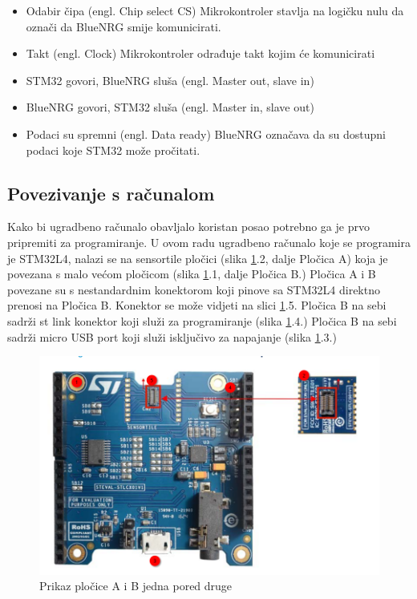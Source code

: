 \documentclass[times, utf8, diplomski]{diplomski}
\begin{document}
\begin{itemize}
  \item Odabir čipa (engl. Chip select CS) Mikrokontroler stavlja na logičku nulu da označi da BlueNRG smije komunicirati.
  \item Takt (engl. Clock) Mikrokontroler odrađuje takt kojim će komunicirati
  \item STM32 govori, BlueNRG sluša (engl. Master out, slave in)
  \item BlueNRG govori, STM32 sluša (engl. Master in, slave out)
  \item Podaci su spremni (engl. Data ready) BlueNRG označava da su dostupni podaci koje STM32 može pročitati.
\end{itemize}

\subsection{Povezivanje s računalom}
Kako bi ugradbeno računalo obavljalo koristan posao potrebno ga je prvo pripremiti za programiranje.
U ovom radu ugradbeno računalo koje se programira je STM32L4, nalazi se na sensortile pločici (slika \ref{fig:plocab}.2, dalje Pločica A) koja je povezana s malo većom pločicom (slika \ref{fig:plocab}.1, dalje Pločica B.)
Pločica A i B povezane su s nestandardnim konektorom koji pinove sa STM32L4 direktno prenosi na Pločica B.
Konektor se može vidjeti na slici \ref{fig:plocab}.5.
Pločica B na sebi sadrži st link \cite{stlink} konektor koji služi za programiranje (slika \ref{fig:plocab}.4.)
Pločica B na sebi sadrži micro USB port koji služi isključivo za napajanje (slika \ref{fig:plocab}.3.)

\begin{figure}[H]
\includegraphics[scale=0.5]{PlocicaAiB.png}
\centering
\caption{Prikaz pločice A i B jedna pored druge \cite{gettingstartedsensor}}
\label{fig:plocab}
\end{figure}
\end{document}
